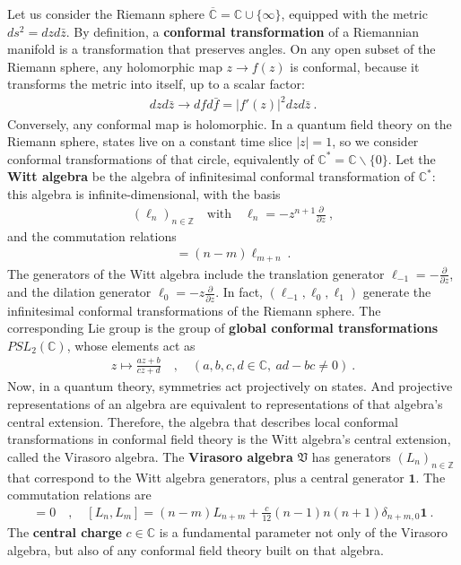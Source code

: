 \documentclass[12pt, a4paper]{article}
\newcommand{\myindex}[1]{\textbf{\boldmath #1}}
\begin{document}
Let us consider the Riemann sphere $\overline{\mathbb{C}}=\mathbb{C}\cup \{\infty\}$, equipped with the metric $ds^2 = dzd\bar z$. By definition, a \myindex{conformal transformation} of a Riemannian manifold is a transformation that preserves angles. On any open subset of the Riemann sphere, any holomorphic map $z\to f(z)$ is conformal, because it transforms the metric into itself, up to a scalar factor: 
\begin{align}
 dzd\bar z\to dfd\bar f = |f'(z)|^2 dzd\bar z\ .
\end{align}
Conversely, any conformal map is holomorphic. 
In a quantum field theory on the Riemann sphere, states live on a constant time slice $|z|=1$, so we consider conformal transformations of that circle, equivalently of $\mathbb{C}^*= \mathbb{C}\backslash \{0\}$.
Let the \myindex{Witt algebra} be the algebra of infinitesimal conformal transformation of $\mathbb{C}^*$: this algebra is infinite-dimensional, with the basis 
\begin{align}
 \left(\ell_n\right)_{n\in\mathbb{Z}}  \quad \text{with} \quad \ell_n = -z^{n+1}\frac{\partial}{\partial z}\ ,
 \label{lpz}
\end{align}
and the commutation relations 
\begin{align}
 [\ell_n,\ell_m] = (n-m)\ell_{m+n}\ .
\end{align}
The generators of the Witt algebra include the translation generator $\ell_{-1} = -\frac{\partial}{\partial z}$, and the dilation generator $\ell_0 = -z\frac{\partial}{\partial z}$. In fact, $(\ell_{-1},\ell_0,\ell_1)$ generate the infinitesimal conformal transformations of the Riemann sphere.
The corresponding Lie group is the group of \myindex{global conformal transformations} $PSL_2(\mathbb{C})$, whose elements act as 
\begin{align}
 z \mapsto \frac{az+b}{cz+d}\quad , \quad (a,b,c,d\in \mathbb{C},\ ad-bc\neq 0)\ .
 \label{abcd}
\end{align}
Now, in a quantum theory, symmetries act projectively on states. And projective representations of an algebra are equivalent to representations of that algebra's central extension. 
Therefore, the algebra that describes local conformal transformations in conformal field theory is the Witt algebra's central extension, called the Virasoro algebra. The \myindex{Virasoro algebra} $\mathfrak{V}$ has generators $(L_n)_{n\in\mathbb{Z}}$ that correspond to the Witt algebra generators, plus a central generator $\mathbf 1$. The commutation relations are 
 \begin{align}
  [\mathbf 1, L_n] = 0 \quad , \quad \boxed{[L_n,L_m] = (n-m)L_{n+m} +\frac{c}{12}(n-1)n(n+1)\delta_{n+m,0}\mathbf 1} \ .
  \label{vir}
 \end{align}
 The \myindex{central charge} $c\in\mathbb{C}$ is a fundamental parameter not only of the Virasoro algebra, but also of any conformal field theory built on that algebra. 
\end{document}
